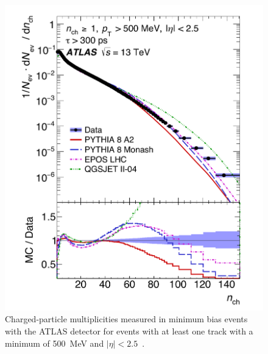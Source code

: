 \begin{enumerate}
\begin{figure}[tbp]
  \centering
  \includegraphics[width=.7\textwidth]{figures/DS_chargedParticleMultiplicities_pileup.pdf}
  \caption{Charged-particle multiplicities measured in minimum bias events with the ATLAS detector for events with at least one track with a minimum \pt of 500~MeV and $|\eta|< 2.5$~\cite{Aad:2016mok}.}
  \label{fig:PILEUPchargedParticleMultiplicities}
\end{figure}


\end{enumerate}
